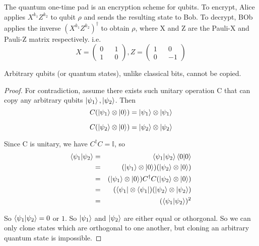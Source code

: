 \begin{definition} \label{def: quantum one-time pad}
The quantum one-time pad is an encryption scheme for qubits. To encrypt, Alice applies $X^{k_1} Z^{k_2}$ to qubit $\rho$ and sends the resulting state to Bob. To decrypt, BOb applies the inverse $(X^{k_1} Z^{k_2})^\dagger$ to obtain $\rho$, where X and Z are the Pauli-X and Pauli-Z matrix respectively. i.e.
\begin{equation}
    X=\begin{pmatrix}
    0 && 1\\
    1 && 0
    \end{pmatrix}, 
    Z=\begin{pmatrix}
    1 && 0\\
    0 && -1
    \end{pmatrix}
\end{equation}
\end{definition}

\begin{theorem} \label{no-cloning thm}
Arbitrary qubits (or quantum states), unlike classical bits, cannot be copied. 
\end{theorem} 

\begin{proof} \cite{Wehner:notes}
For contradiction, assume there exists such unitary operation C that can copy any arbitrary qubits $\ket{\psi_1}, \ket{\psi_2}$. Then
\begin{equation*}
    C(\ket{\psi_1} \otimes \ket{0})=\ket{\psi_1} \otimes \ket{\psi_1}
\end{equation*}

\begin{equation*}
C(\ket{\psi_2} \otimes \ket{0})=\ket{\psi_2} \otimes \ket{\psi_2}  
\end{equation*}
    

Since C is unitary, we have $C^\dagger C=\mathbb{I}$, so
\begin{eqnarray*}
\braket{\psi_1|\psi_2}&=&\braket{\psi_1|\psi_2}\braket{0|0}\\
&=&(\ket{\psi_1} \otimes \ket{0})(\ket{\psi_2} \otimes \ket{0})\\
&=&(\ket{\psi_1} \otimes \ket{0})C^\dagger C(\ket{\psi_2} \otimes \ket{0})\\
&=&(\bra{\psi_1} \otimes \bra{\psi_1})(\ket{\psi_2} \otimes \ket{\psi_2})\\
&=&(\braket{\psi_1 |\psi_2})^2
\end{eqnarray*}

So $\braket{\psi_1 | \psi_2}=0$ or $1$. So $\ket{\psi_1}$ and $\ket{\psi_2}$ are either equal or othorgonal. So we can only clone states which are orthogonal to one another, but cloning an arbitrary quantum state is impossible. 
\end{proof}

